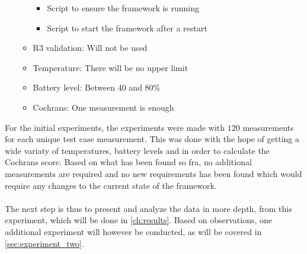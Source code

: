 \begin{itemize}
\begin{itemize}
\begin{itemize}
            \item Script to ensure the framework is running
            \item Script to start the framework after a restart
        \end{itemize}
        \item R3 validation: Will not be used
        \item Temperature: There will be no upper limit
        \item Battery level: Between 40 and 80\%
        \item Cochrans: One measurement is enough
    \end{itemize}
\end{itemize}

For the initial experiments, the experiments were made with $120$ measurements for each unique test case measurement. This was done with the hope of getting a wide variaty of temperatures, battery levels and in order to calculate the Cochrans score. Based on what has been found so fra, no additional measurements are required and no new requirements has been found which would require any changes to the current state of the framework.

\paragraph*{}
The next step is thus to present and analyze the data in more depth, from this experiment, which will be done in \cref{ch:results}. Based on observations, one additional experiment will however be conducted, as will be covered in \cref*{sec:experiment_two}.